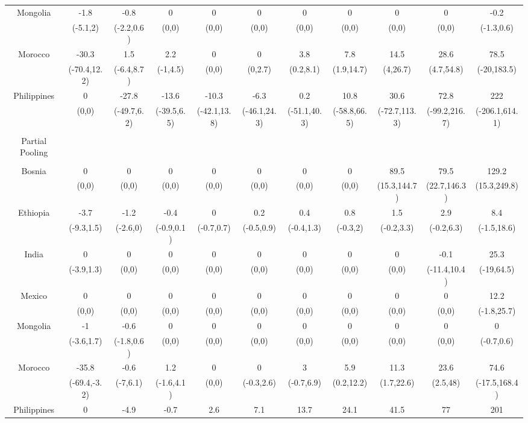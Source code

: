 \documentclass[AER]{AEA}
\begin{document}
\begin{landscape}
\begin{table}[!htbp]
\begin{tabular}{@{\extracolsep{5pt}} ccccccccccc}
 Mongolia & -1.8 & -0.8 & 0 & 0 & 0 & 0 & 0 & 0 & 0 & -0.2 \\
 & (-5.1,2) & (-2.2,0.6) & (0,0) & (0,0) & (0,0) & (0,0) & (0,0) & (0,0) & (0,0) & (-1.3,0.6) \\
 Morocco & -30.3 & 1.5 & 2.2 & 0 & 0 & 3.8 & 7.8 & 14.5 & 28.6 & 78.5 \\
 & (-70.4,12.2) & (-6.4,8.7) & (-1,4.5) & (0,0) & (0,2.7) & (0.2,8.1) & (1.9,14.7) & (4,26.7) & (4.7,54.8) & (-20,183.5) \\
 Philippines & 0 & -27.8 & -13.6 & -10.3 & -6.3 & 0.2 & 10.8 & 30.6 & 72.8 & 222 \\
& (0,0) & (-49.7,6.2) & (-39.5,6.5) & (-42.1,13.8) & (-46.1,24.3) & (-51.1,40.3) & (-58.8,66.5) & (-72.7,113.3) & (-99.2,216.7) & (-206.1,614.1) \\
\hline \\[-1.8ex]
Partial Pooling &&&&&&&&&& \\
\hline \\[-1.8ex]
 Bosnia & 0 & 0 & 0 & 0 & 0 & 0 & 0 & 89.5 & 79.5 & 129.2 \\
 & (0,0) & (0,0) & (0,0) & (0,0) & (0,0) & (0,0) & (0,0) & (15.3,144.7) & (22.7,146.3) & (15.3,249.8) \\
Ethiopia & -3.7 & -1.2 & -0.4 & 0 & 0.2 & 0.4 & 0.8 & 1.5 & 2.9 & 8.4 \\
& (-9.3,1.5) & (-2.6,0) & (-0.9,0.1) & (-0.7,0.7) & (-0.5,0.9) & (-0.4,1.3) & (-0.3,2) & (-0.2,3.3) & (-0.2,6.3) & (-1.5,18.6) \\
 India & 0 & 0 & 0 & 0 & 0 & 0 & 0 & 0 & -0.1 & 25.3 \\
& (-3.9,1.3) & (0,0) & (0,0) & (0,0) & (0,0) & (0,0) & (0,0) & (0,0) & (-11.4,10.4) & (-19,64.5) \\
 Mexico & 0 & 0 & 0 & 0 & 0 & 0 & 0 & 0 & 0 & 12.2 \\
 & (0,0) & (0,0) & (0,0) & (0,0) & (0,0) & (0,0) & (0,0) & (0,0) & (0,0) & (-1.8,25.7) \\
 Mongolia & -1 & -0.6 & 0 & 0 & 0 & 0 & 0 & 0 & 0 & 0 \\
& (-3.6,1.7) & (-1.8,0.6) & (0,0) & (0,0) & (0,0) & (0,0) & (0,0) & (0,0) & (0,0) & (-0.7,0.6) \\
Morocco & -35.8 & -0.6 & 1.2 & 0 & 0 & 3 & 5.9 & 11.3 & 23.6 & 74.6 \\
& (-69.4,-3.2) & (-7,6.1) & (-1.6,4.1) & (0,0) & (-0.3,2.6) & (-0.7,6.9) & (0.2,12.2) & (1.7,22.6) & (2.5,48) & (-17.5,168.4) \\
 Philippines & 0 & -4.9 & -0.7 & 2.6 & 7.1 & 13.7 & 24.1 & 41.5 & 77 & 201 \\

\end{tabular}
\end{table}
\end{landscape}
\end{document}
